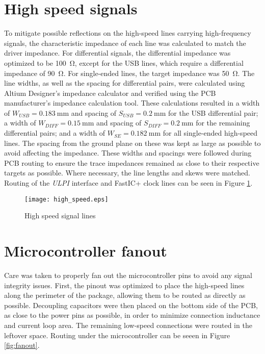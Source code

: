 \section{High speed signals}
To mitigate possible reflections on the high-speed lines carrying high-frequency signals, the characteristic impedance of each line was calculated to match the driver impedance. For differential signals, the differential impedance was optimized to be \SI{100}{\ohm}, except for the USB lines, which require a differential impedance of \SI{90}{\ohm}. For single-ended lines, the target impedance was \SI{50}{\ohm}.
The line widths, as well as the spacing for differential pairs, were calculated using Altium Designer’s impedance calculator and verified using the PCB manufacturer’s impedance calculation tool. These calculations resulted in a width of $W_{USB} = \SI{0.183}{\milli\meter}$ and spacing of $S_{USB} = \SI{0.2}{\milli\meter}$ for the USB differential pair; a width of $W_{DIFF} = \SI{0.15}{\milli\meter}$ and spacing of $S_{DIFF} = \SI{0.2}{\milli\meter}$ for the remaining differential pairs; and a width of $W_{SE} = \SI{0.182}{\milli\meter}$ for all single-ended high-speed lines. The spacing from the ground plane on these was kept as large as possible to avoid affecting the impedance. These widths and spacings were followed during PCB routing to ensure the trace impedances remained as close to their respective targets as possible. Where necessary, the line lengths and skews were matched. Routing of the \emph{ULPI} interface and FastIC+ clock lines can be seen in Figure \ref{fig:highspeed}.

\FloatBarrier
\begin{figure}[htp!]
    \centering
    \texttt{[image: high\_speed.eps]}
    \caption{High speed signal lines}
    \label{fig:highspeed}
\end{figure}
\FloatBarrier

\section{Microcontroller fanout}
Care was taken to properly fan out the microcontroller pins to avoid any signal integrity issues. First, the pinout was optimized to place the high-speed lines along the perimeter of the package, allowing them to be routed as directly as possible. Decoupling capacitors were then placed on the bottom side of the PCB, as close to the power pins as possible, in order to minimize connection inductance and current loop area. The remaining low-speed connections were routed in the leftover space. Routing under the microcontroller can be seeen in Figure \ref{fig:fanout}.


